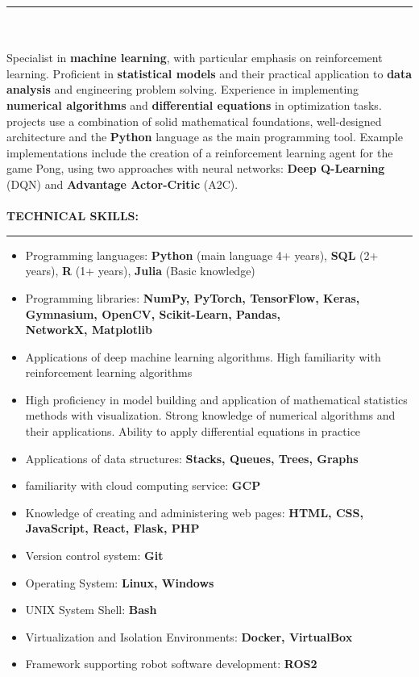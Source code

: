 \documentclass[10pt]{article}
\newcommand{\longline}{\rule{19.6cm}{1pt}}
\begin{document}
\noindent \longline 
\\ \\
\noindent Specialist in \textbf{machine learning}, with particular emphasis on reinforcement learning. 
Proficient in \textbf{statistical models} and their practical application to \textbf{data analysis} and engineering problem solving.
Experience in implementing \textbf{numerical algorithms} and \textbf{differential equations} in optimization tasks. 
projects use a combination of solid mathematical foundations, well-designed architecture and the \textbf{Python} language as the main programming tool. 
Example implementations include the creation of a reinforcement learning agent for the game Pong, 
using two approaches with neural networks: \textbf{Deep Q-Learning} (DQN) and \textbf{Advantage Actor-Critic} (A2C).
\\ \\
\noindent \fontsize{14pt}{14pt}\selectfont \textbf{\color{Violet}TECHNICAL SKILLS:}
\fontsize{10pt}{10pt}\selectfont 
\\ 
\noindent \longline 
\begin{itemize}[leftmargin=*, parsep=0.5pt]
    \item Programming languages: \textbf{Python} (main language 4+ years), \textbf{SQL} (2+ years), \textbf{R} (1+ years), \textbf{Julia} (Basic knowledge)
    \item Programming libraries: \textbf{NumPy, PyTorch, TensorFlow, Keras, Gymnasium, OpenCV, Scikit-Learn, Pandas, \\ NetworkX, Matplotlib}
    \item Applications of deep machine learning algorithms. High familiarity with reinforcement learning algorithms
    \item High proficiency in model building and application of mathematical statistics methods with visualization. Strong knowledge of
    numerical algorithms and their applications. Ability to apply differential equations in practice
    \item Applications of data structures: \textbf{Stacks, Queues, Trees, Graphs}
    \item familiarity with cloud computing service: \textbf{GCP}
    \item Knowledge of creating and administering web pages: \textbf{HTML, CSS, JavaScript, React, Flask, PHP}
    \item Version control system: \textbf{Git}
    \item Operating System: \textbf{Linux, Windows}
    \item UNIX System Shell: \textbf{Bash} 
    \item Virtualization and Isolation Environments: \textbf{Docker, VirtualBox}
    \item Framework supporting robot software development: \textbf{ROS2}
\end{itemize}
\end{document}
